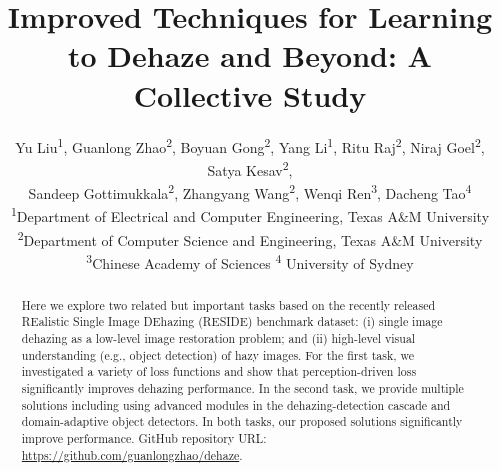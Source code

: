 \documentclass[10pt,twocolumn,letterpaper]{article}
\begin{document}

\title{Improved Techniques for Learning to Dehaze and Beyond: A Collective Study}
\author{Yu Liu\textsuperscript{1}, Guanlong Zhao\textsuperscript{2}, Boyuan Gong\textsuperscript{2}, Yang Li\textsuperscript{1}, Ritu Raj\textsuperscript{2}, Niraj Goel\textsuperscript{2}, Satya Kesav\textsuperscript{2}, \\ Sandeep Gottimukkala\textsuperscript{2}, Zhangyang Wang\textsuperscript{2}, Wenqi Ren\textsuperscript{3}, Dacheng Tao\textsuperscript{4}\\
\textsuperscript{1}Department of Electrical and Computer Engineering, Texas A\&M University\\
\textsuperscript{2}Department of Computer Science and Engineering, Texas A\&M University \\
\textsuperscript{3}Chinese Academy of Sciences \qquad
\textsuperscript{4} 
University of Sydney
%
}

\maketitle

\begin{abstract}
\vspace{-1em}
Here we explore two related but important tasks based on the recently released REalistic Single Image DEhazing (RESIDE) benchmark dataset: (i) single image dehazing as a low-level image restoration problem; and (ii) high-level visual understanding (e.g., object detection) of hazy images. For the first task, we investigated a variety of loss functions and show that perception-driven loss significantly improves dehazing performance. In the second task, we provide multiple solutions including using advanced modules in the dehazing-detection cascade and domain-adaptive object detectors. In both tasks, our proposed solutions significantly improve performance. GitHub repository URL: \url{https://github.com/guanlongzhao/dehaze}. 

\end{abstract}
\vspace{-1em}
\end{document}
